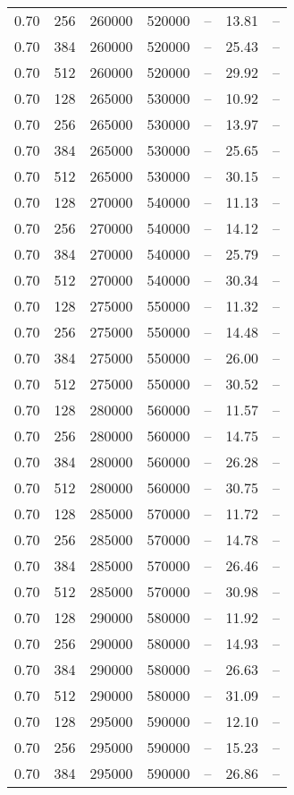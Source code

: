 \begin{tabular}{l|l|l|l|l|l|l}
0.70 & 256 & 260000 & 520000 & -- & 13.81 & --\\
0.70 & 384 & 260000 & 520000 & -- & 25.43 & --\\
0.70 & 512 & 260000 & 520000 & -- & 29.92 & --\\
0.70 & 128 & 265000 & 530000 & -- & 10.92 & --\\
0.70 & 256 & 265000 & 530000 & -- & 13.97 & --\\
0.70 & 384 & 265000 & 530000 & -- & 25.65 & --\\
0.70 & 512 & 265000 & 530000 & -- & 30.15 & --\\
0.70 & 128 & 270000 & 540000 & -- & 11.13 & --\\
0.70 & 256 & 270000 & 540000 & -- & 14.12 & --\\
0.70 & 384 & 270000 & 540000 & -- & 25.79 & --\\
0.70 & 512 & 270000 & 540000 & -- & 30.34 & --\\
0.70 & 128 & 275000 & 550000 & -- & 11.32 & --\\
0.70 & 256 & 275000 & 550000 & -- & 14.48 & --\\
0.70 & 384 & 275000 & 550000 & -- & 26.00 & --\\
0.70 & 512 & 275000 & 550000 & -- & 30.52 & --\\
0.70 & 128 & 280000 & 560000 & -- & 11.57 & --\\
0.70 & 256 & 280000 & 560000 & -- & 14.75 & --\\
0.70 & 384 & 280000 & 560000 & -- & 26.28 & --\\
0.70 & 512 & 280000 & 560000 & -- & 30.75 & --\\
0.70 & 128 & 285000 & 570000 & -- & 11.72 & --\\
0.70 & 256 & 285000 & 570000 & -- & 14.78 & --\\
0.70 & 384 & 285000 & 570000 & -- & 26.46 & --\\
0.70 & 512 & 285000 & 570000 & -- & 30.98 & --\\
0.70 & 128 & 290000 & 580000 & -- & 11.92 & --\\
0.70 & 256 & 290000 & 580000 & -- & 14.93 & --\\
0.70 & 384 & 290000 & 580000 & -- & 26.63 & --\\
0.70 & 512 & 290000 & 580000 & -- & 31.09 & --\\
0.70 & 128 & 295000 & 590000 & -- & 12.10 & --\\
0.70 & 256 & 295000 & 590000 & -- & 15.23 & --\\
0.70 & 384 & 295000 & 590000 & -- & 26.86 & --\\

\end{tabular}
